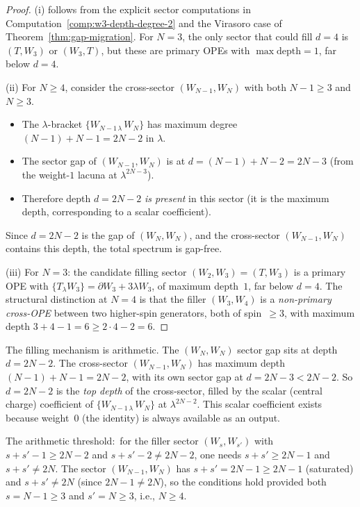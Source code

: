 \begin{proof}
(i) follows from the explicit sector computations in
Computation~\ref{comp:w3-depth-degree-2} and the Virasoro
case of Theorem~\ref{thm:gap-migration}. For $N = 3$,
the only sector that could fill $d = 4$ is $(T, W_3)$
or $(W_3, T)$, but these are primary OPEs with
$\max\text{depth} = 1$, far below $d = 4$.

(ii) For $N \ge 4$, consider the cross-sector
$(W_{N-1}, W_N)$ with both $N - 1 \ge 3$ and $N \ge 3$.
\begin{itemize}
\item The $\lambda$-bracket
 $\{W_{N-1\,\lambda}\, W_N\}$ has maximum degree
 $(N-1) + N - 1 = 2N - 2$ in $\lambda$.
\item The sector gap of $(W_{N-1}, W_N)$ is at
 $d = (N-1) + N - 2 = 2N - 3$
 (from the weight-$1$ lacuna at $\lambda^{2N-3}$).
\item Therefore depth $d = 2N - 2$ \emph{is present}
 in this sector (it is the maximum depth, corresponding
 to a scalar coefficient).
\end{itemize}
Since $d = 2N - 2$ is the gap of $(W_N, W_N)$, and the
cross-sector $(W_{N-1}, W_N)$ contains this depth, the
total spectrum is gap-free.

(iii) For $N = 3$: the candidate filling sector
$(W_2, W_3) = (T, W_3)$ is a primary OPE with
$\{T_\lambda W_3\} = \partial W_3 + 3\lambda W_3$,
of maximum depth~$1$, far below $d = 4$. The
structural distinction at $N = 4$ is that the filler
$(W_3, W_4)$ is a
\emph{non-primary cross-OPE} between two higher-spin
generators, both of spin~$\ge 3$, with maximum depth
$3 + 4 - 1 = 6 \ge 2 \cdot 4 - 2 = 6$.
\end{proof}

\begin{remark}%
\label{rem:cross-sector-mechanism}%
%
The filling mechanism is arithmetic. The $(W_N, W_N)$
sector gap sits at depth $d = 2N - 2$. The cross-sector
$(W_{N-1}, W_N)$ has maximum depth
$(N-1) + N - 1 = 2N - 2$, with its own sector gap at
$d = 2N - 3 < 2N - 2$. So $d = 2N - 2$ is the
\emph{top depth} of the cross-sector, filled by the scalar
(central charge) coefficient of $\{W_{N-1\,\lambda}\, W_N\}$
at $\lambda^{2N-2}$. This scalar coefficient exists because
weight~$0$ (the identity) is always available as an output.

The arithmetic threshold:\ for the filler sector $(W_{s}, W_{s'})$
with $s + s' - 1 \ge 2N - 2$ and $s + s' - 2 \ne 2N - 2$,
one needs $s + s' \ge 2N - 1$ and $s + s' \ne 2N$.
The sector $(W_{N-1}, W_N)$ has $s + s' = 2N - 1 \ge 2N - 1$
(saturated) and $s + s' \ne 2N$ (since $2N - 1 \ne 2N$),
so the conditions hold provided both $s = N - 1 \ge 3$ and
$s' = N \ge 3$, i.e., $N \ge 4$.
\end{remark}

